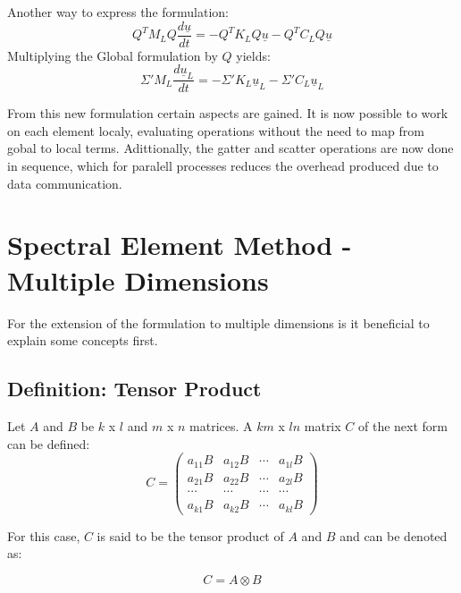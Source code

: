 \documentclass[
  a4paper,
  10pt]{article}
\begin{document}
Another way to express the formulation: \begin{equation}
         Q^{T}M_{L}Q\frac{d\underline{u}}{dt} = - Q^{T}K_LQ\underline{u} - Q^{T}C_LQ\underline{u}    
\end{equation} Multiplying the Global formulation by \(Q\) yields:
\begin{equation}
         \Sigma' M_{L}\frac{d\underline{u}_{L}}{dt} = - \Sigma'K_L\underline{u}_L - \Sigma'C_L\underline{u}_L    
\end{equation}

From this new formulation certain aspects are gained. It is now possible
to work on each element localy, evaluating operations without the need
to map from gobal to local terms. Adittionally, the gatter and scatter
operations are now done in sequence, which for paralell processes
reduces the overhead produced due to data communication.

\hypertarget{spectral-element-method---multiple-dimensions}{%
\section{Spectral Element Method - Multiple
Dimensions}\label{spectral-element-method---multiple-dimensions}}

For the extension of the formulation to multiple dimensions is it
beneficial to explain some concepts first.

\hypertarget{definition-tensor-product}{%
\subsection{Definition: Tensor
Product}\label{definition-tensor-product}}

Let \(A\) and \(B\) be \(k\) x \(l\) and \(m\) x \(n\) matrices. A
\(km\) x \(ln\) matrix \(C\) of the next form can be defined:
\begin{equation}
C=
\begin{pmatrix}
a_{11}B & a_{12}B & \cdots & a_{1l}B\\
a_{21}B & a_{22}B & \cdots & a_{2l}B\\
\cdots & \cdots & \cdots & \cdots\\
a_{k1}B & a_{k2}B & \cdots & a_{kl}B
\end{pmatrix}
\end{equation}

For this case, \(C\) is said to be the tensor product of \(A\) and \(B\)
and can be denoted as:

\begin{equation}
    C=A \otimes B
\end{equation}
\end{document}
